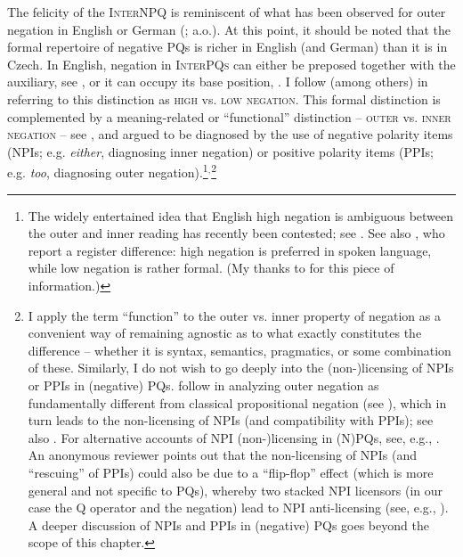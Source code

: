 \documentclass[output=paper,colorlinks,citecolor=brown]{langscibook}
\begin{document}
\noindent The felicity of the \textsc{InterNPQ} is reminiscent of what has been observed for outer negation in English or German (\citealt{Ladd1981,Buring.Gunlogson2000,Romero.Han2004,Repp2013}; a.o.). At this point, it should be noted that the formal repertoire of negative PQs is richer in English (and German) than it is in Czech. In English, negation in \textsc{InterPQs} can either be preposed together with the auxiliary, see , or it can occupy its base position, . I follow \citet{AnderBois2019} (among others) in referring to this distinction as \textsc{high} vs. \textsc{low negation}. This formal distinction is complemented by a meaning-related or ``functional'' distinction -- \textsc{outer} vs. \textsc{inner negation} -- see , and argued to be diagnosed by the use of negative polarity items (NPIs; e.g. \textit{either}, diagnosing inner negation) or positive polarity items (PPIs; e.g. \textit{too}, diagnosing outer negation).\footnote{The widely entertained idea that English high negation is ambiguous between the outer and inner reading \citep{Ladd1981,Romero.Han2004,Repp2013,Romero2015} has recently been contested; see \citet{Sailor2013,AnderBois2019,Goodhue2022}. See also \citet[809]{Quirk.etal1985}, who report a register difference: high negation is preferred in spoken language, while low negation is rather formal. (My thanks to \citealt[141]{Mitkovska.Buzarovska2024} for this piece of information.)}$^,$\footnote{I apply the term ``function'' to the outer vs. inner property of negation as a convenient way of remaining agnostic as to what exactly constitutes the difference -- whether it is syntax, semantics, pragmatics, or some combination of these. Similarly, I do not wish to go deeply into the (non-)licensing of NPIs or PPIs in (negative) PQs. \citet{Stankova2023,Stankova.Simik2025} follow \citet{Repp2006} in analyzing outer negation as fundamentally different from classical propositional negation (see ), which in turn leads to the non-licensing of NPIs (and compatibility with PPIs); see also . For alternative accounts of NPI \mbox{(non-)}li\-censing in (N)PQs, see, e.g., \citet{vanRooy2003,Nicolae2013,Trinh2023}. An anonymous reviewer points out that the non-licensing of NPIs (and ``rescuing'' of PPIs) could also be due to a ``flip-flop'' effect (which is more general and not specific to PQs), whereby two stacked NPI licensors (in our case the Q operator and the negation) lead to NPI anti-licensing (see, e.g., \citealt{Homer2021}). A deeper discussion of NPIs and PPIs in (negative) PQs goes beyond the scope of this chapter.\label{sim:fn:npi-licensing}}
\end{document}
